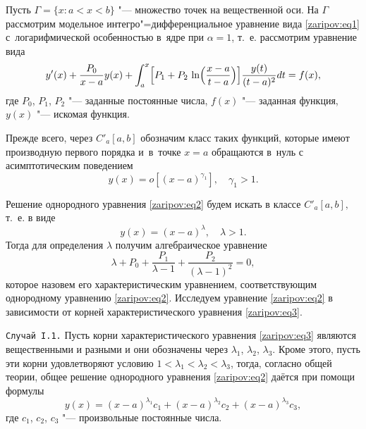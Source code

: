 \smallskip

Пусть $ \Gamma=\{x:a<x<b \}$ "--- множество точек на вещественной оси. 
На $ \Gamma$ рассмотрим модельное интегро"=дифференциальное уравнение вида \eqref{zaripov:eq1} с~логарифмической особенностью в~ядре при $\alpha=1$, т.~е. рассмотрим уравнение вида
\begin{equation}
y'(x)+\frac{P_{0}}{x-a}y(x)+\int _{a}^{x}
\Bigl[P_{1}+{P_{2}\,\ln\Bigl(\frac{x-a}{{t-a}}\Bigr)}\Bigr]
\frac{y(t)}{(t-a)^2}dt=f(x),
\label{zaripov:eq2}
\end{equation}
где $P_0$, $P_1$, $P_2 $ "--- заданные постоянные числа, $f(x)$ "--- заданная функция, $y(x)$ "--- искомая функция.

Прежде всего, через  $C'_a[a,b] $   обозначим класс таких функций, которые имеют производную первого порядка и~в~точке $x=a$  обращаются в~нуль с асимптотическим поведением
$$
y(x)=o[(x-a)^{\gamma_1}], \quad  \gamma_1>1.
$$

Решение однородного уравнения \eqref{zaripov:eq2} будем искать в классе $C'_a[a,b], $  т.~е. в виде $$y(x)=(x-a)^{\lambda}, \quad {\lambda}>1.$$ 
Тогда для определения $\lambda$  получим алгебраическое уравнение
\begin{equation}
\lambda+P_0+\frac{P_1}{\lambda-1}+\frac{P_2}{(\lambda-1)^2}=0,
\label{zaripov:eq3}
\end{equation}
которое назовем его характеристическим уравнением, соответствующим однородному уравнению \eqref{zaripov:eq2}. 
Исследуем уравнение  \eqref{zaripov:eq2} в зависимости от корней характеристического уравнения \eqref{zaripov:eq3}. 

\smallskip

\texttt{Случай I.1.}
Пусть корни характеристического уравнения \eqref{zaripov:eq3} являются вещественными и разными и они обозначены через $\lambda_1$, $\lambda_2$, $\lambda_3$. 
Кроме этого, пусть эти корни удовлетворяют условию $1<\lambda_1< \lambda_2< \lambda_3$, тогда, согласно общей теории, общее решение однородного уравнения \eqref{zaripov:eq2} даётся при помощи формулы 
$$
y(x)={(x-a)^{\lambda_1}}c_1+{(x-a)^{\lambda_2}}c_2+{(x-a)^{\lambda_3}}c_3,
$$
где $c_1$, $c_2$, $c_3$   "--- произвольные постоянные числа.

